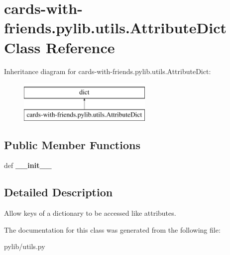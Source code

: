 \hypertarget{classcards-with-friends_1_1pylib_1_1utils_1_1_attribute_dict}{\section{cards-\/with-\/friends.pylib.\-utils.\-Attribute\-Dict Class Reference}
\label{classcards-with-friends_1_1pylib_1_1utils_1_1_attribute_dict}
}
Inheritance diagram for cards-\/with-\/friends.pylib.\-utils.\-Attribute\-Dict\-:\begin{figure}[H]
\begin{center}
\leavevmode
\includegraphics[height=2.000000cm]{classcards-with-friends_1_1pylib_1_1utils_1_1_attribute_dict}
\end{center}
\end{figure}
\subsection*{Public Member Functions}
\begin{DoxyCompactItemize}
\item 
\hypertarget{classcards-with-friends_1_1pylib_1_1utils_1_1_attribute_dict_a3e07d5952f9f7bc7469bcc30cecc9a96}{def {\bfseries \-\_\-\-\_\-init\-\_\-\-\_\-}}\label{classcards-with-friends_1_1pylib_1_1utils_1_1_attribute_dict_a3e07d5952f9f7bc7469bcc30cecc9a96}

\end{DoxyCompactItemize}


\subsection{Detailed Description}
\begin{DoxyVerb}Allow keys of a dictionary to be accessed like attributes.\end{DoxyVerb}
 

The documentation for this class was generated from the following file\-:\begin{DoxyCompactItemize}
\item 
pylib/utils.\-py\end{DoxyCompactItemize}
